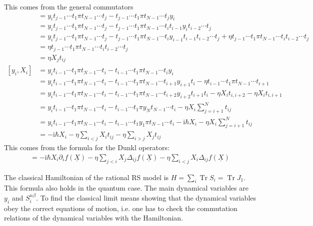 \documentclass[11pt]{report}
\theoremstyle{definition}
\theoremstyle{remark}
\theoremstyle{remark}
\newcommand{\I}{\mathrm{i}}
\begin{document}
This comes from the general commutators
\begin{align*}
[y_i,X_j]
&= y_i t_{j-1} \cdots t_1 \pi t_{N-1} \cdots t_j - t_{j-1} \cdots t_1 \pi t_{N-1} \cdots t_j y_i \\
&= y_i t_{j-1} \cdots t_1 \pi t_{N-1} \cdots t_j - t_{j-1} \cdots t_1 \pi t_{N-1} \cdots t_i t_{i-1} y_i t_{i-2} \cdots t_j \\
&= y_i t_{j-1} \cdots t_1 \pi t_{N-1} \cdots t_j - t_{j-1} \cdots t_1 \pi t_{N-1} \cdots t_i y_{i-1} t_{i-1} t_{i-2} \cdots t_j + \eta t_{j-1} \cdots t_1 \pi t_{N-1} \cdots t_i t_{i-2} \cdots t_j \\
&= \eta t_{j-1} \cdots t_1 \pi t_{N-1} \cdots t_i t_{i-2} \cdots t_j \\
&= \eta X_j t_{ij} \\
[y_i,X_i]
&= y_i t_{i-1} \cdots t_1 \pi t_{N-1} \cdots t_i - t_{i-1} \cdots t_1 \pi t_{N-1} \cdots t_i y_i \\
&= y_i t_{i-1} \cdots t_1 \pi t_{N-1} \cdots t_i - t_{i-1} \cdots t_1 \pi t_{N-1} \cdots t_{i+1} y_{i+1} t_i - \eta t_{i-1} \cdots t_1 \pi t_{N-1} \cdots t_{i+1} \\
&= y_i t_{i-1} \cdots t_1 \pi t_{N-1} \cdots t_i - t_{i-1} \cdots t_1 \pi t_{N-1} \cdots t_{i+2} y_{i+2} t_{i+1} t_i - \eta X_i t_{i,i+2} - \eta X_i t_{i,i+1} \\
&= y_i t_{i-1} \cdots t_1 \pi t_{N-1} \cdots t_i - t_{i-1} \cdots t_1 \pi y_N t_{N-1} \cdots t_i - \eta X_i \sum_{j=i+1}^N t_{ij} \\
&= y_i t_{i-1} \cdots t_1 \pi t_{N-1} \cdots t_i - t_{i-1} \cdots t_1 y_1 \pi t_{N-1} \cdots t_i - \I \hbar X_i - \eta X_i \sum_{j=i+1}^N t_{ij} \\
&= - \I \hbar X_i - \eta \sum_{i < j} X_i t_{ij} - \eta \sum_{i > j} X_j t_{ij}
\end{align*}
This comes from the formula for the Dunkl operators:
\begin{align*}
[y_i,f(\underline{X})] = -\I\hbar X_i \partial_i f(\underline{X}) - \eta \sum_{j<i} X_j \Delta_{ij} f(\underline{X}) - \eta \sum_{i<j} X_i \Delta_{ij} f(\underline{X})
\end{align*}

The classical Hamiltonian of the rational RS model is $H = \sum_i \operatorname{Tr} S_i = \operatorname{Tr} J_1$. This formula also holds in the quantum case. The main dynamical variables are $y_i$ and $S_i^{\alpha\beta}$. To find the classical limit means showing that the dynamical variables obey the correct equations of motion, i.e. one has to check the commutation relations of the dynamical variables with the Hamiltonian.
\end{document}
